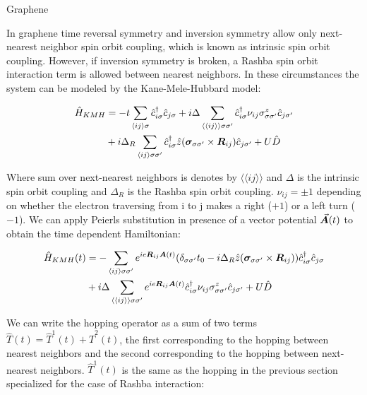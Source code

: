 \begin{section}{Graphene}

In graphene time reversal symmetry and inversion symmetry allow only next-nearest neighbor spin orbit coupling, which is known as intrinsic spin orbit coupling. However, if inversion symmetry is broken, a Rashba spin orbit interaction term is allowed between nearest neighbors. In these circumstances the system can be modeled by the Kane-Mele-Hubbard model:

\begin{align}
\hat{H}_{KMH} &= -t\sum_{\langle i j \rangle \sigma} \hat{c}^{\dagger}_{i\sigma}\hat{c}_{j\sigma} + i\Delta \sum_{\langle \langle i j \rangle \rangle \sigma \sigma'} \hat{c}^{\dagger}_{i\sigma} \nu_{ij} \sigma^z_{\sigma \sigma'} \hat{c}_{j\sigma'} \nonumber \\
&+ i\Delta_R \sum_{\langle i j \rangle \sigma \sigma'} \hat{c}^{\dagger}_{i\sigma} \hat{z}(\boldsymbol{\sigma}_{\sigma \sigma'} \times \boldsymbol{R}_{ij}) \hat{c}_{j\sigma'} + U\hat{D}
\end{align}

Where sum over next-nearest neighbors is denotes by $\langle \langle i j \rangle \rangle$ and $\Delta$ is the intrinsic spin orbit coupling and $\Delta_R$ is the Rashba spin orbit coupling. $\nu_{ij}=\pm 1$ depending on whether the electron traversing from i to j makes a right ($+1$) or a left turn ($-1$).
We can apply Peierls substitution in presence of a vector potential $\vec{\boldsymbol{A}}(t)$ to obtain the time dependent Hamiltonian:

\begin{align}
\hat{H}_{KMH}(t) &= -\sum_{\langle i j \rangle \sigma \sigma'} e^{ie\boldsymbol{R}_{ij}\boldsymbol{A}(t)} (\delta_{\sigma \sigma'}t_0 - i\Delta_R \hat{z}(\boldsymbol{\sigma}_{\sigma \sigma'} \times \boldsymbol{R}_{ij})) \hat{c}^{\dagger}_{i\sigma}\hat{c}_{j\sigma} \nonumber \\
&+ i\Delta \sum_{\langle \langle i j \rangle \rangle \sigma \sigma'}  e^{ie\boldsymbol{R}_{ij}\boldsymbol{A}(t)} \hat{c}^{\dagger}_{i\sigma} \nu_{ij} \sigma^z_{\sigma \sigma'} \hat{c}_{j\sigma'} + U\hat{D}
\end{align}

We can write the hopping operator as a sum of two terms $\hat{T}(t) = \hat{T}^1(t) + \hat{T}^2(t)$, the first corresponding to the hopping between nearest neighbors and the second corresponding to the hopping between next-nearest neighbors. $\hat{T}^1(t)$ is the same as the hopping in the previous section specialized for the case of Rashba interaction:


\end{section}
